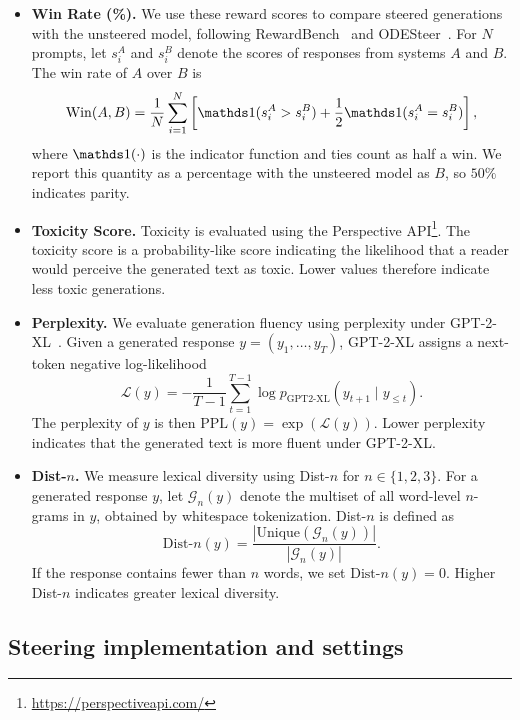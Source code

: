 \begin{itemize}
    \item \textbf{Win Rate (\%).}
    We use these reward scores to compare steered generations with the unsteered model, following RewardBench~\citep{lambert2025rewardbench} and ODESteer~\citep{zhaoodesteer}. For $N$ prompts, let $s_i^A$ and $s_i^B$ denote the scores of responses from systems $A$ and $B$. The win rate of $A$ over $B$ is
    \[
    \mathrm{Win}(A,B)
    =
    \frac{1}{N}
    \sum_{i=1}^{N}
    \left[
    \mathbbm{1}(s_i^A > s_i^B)
    +
    \frac{1}{2}\mathbbm{1}(s_i^A = s_i^B)
    \right],
    \]
    where $\mathbbm{1}(\cdot)$ is the indicator function and ties count as half a win. We report this quantity as a percentage with the unsteered model as $B$, so $50\%$ indicates parity.

    \item \textbf{Toxicity Score.}
    Toxicity is evaluated using the Perspective API\footnote{\url{https://perspectiveapi.com/}}. The toxicity score is a probability-like score indicating the likelihood that a reader would perceive the generated text as toxic. Lower values therefore indicate less toxic generations.

    \item \textbf{Perplexity.}
    We evaluate generation fluency using perplexity under GPT-2-XL~\cite{radford2019language}. Given a generated response $y=(y_1,\ldots,y_T)$, GPT-2-XL assigns a next-token negative log-likelihood
    \[
    \mathcal{L}(y)
    =
    -\frac{1}{T-1}
    \sum_{t=1}^{T-1}
    \log p_{\text{GPT2-XL}}(y_{t+1}\mid y_{\leq t}).
    \]
    The perplexity of $y$ is then
    $\mathrm{PPL}(y)
    =
    \exp\left(\mathcal{L}(y)\right).$ Lower perplexity indicates that the generated text is more fluent under GPT-2-XL.

    \item \textbf{Dist-$n$.}
    We measure lexical diversity using Dist-$n$ for $n\in\{1,2,3\}$. For a generated response $y$, let $\mathcal{G}_n(y)$ denote the multiset of all word-level $n$-grams in $y$, obtained by whitespace tokenization. Dist-$n$ is defined as
    \[
    \mathrm{Dist}\text{-}n(y)
    =
    \frac{
    \left|\mathrm{Unique}(\mathcal{G}_n(y))\right|
    }{
    \left|\mathcal{G}_n(y)\right|
    }.
    \]
    If the response contains fewer than $n$ words, we set $\mathrm{Dist}\text{-}n(y)=0$. Higher Dist-$n$ indicates greater lexical diversity.
\end{itemize}

\subsection{Steering implementation and settings}
\label{appendix:implementation_details}
\label{apx:bandwidth}
\label{apx:pseudocode}


